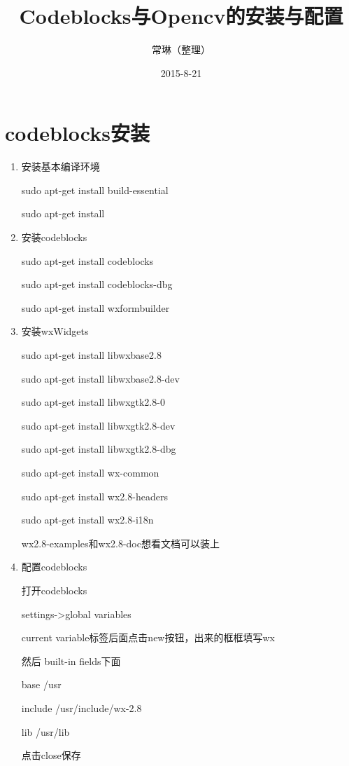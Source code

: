 \documentclass[a4paper,12pt]{article}
\title{Codeblocks与Opencv的安装与配置}
\author{常琳（整理）}
\date{2015-8-21}
\begin{document}
\maketitle

\section{codeblocks安装}

\begin{enumerate}

\item 安装基本编译环境

sudo apt-get install build-essential

sudo apt-get install

\item 安装codeblocks

sudo apt-get install codeblocks

sudo apt-get install codeblocks-dbg

sudo apt-get install wxformbuilder

\item 安装wxWidgets

sudo apt-get install libwxbase2.8

sudo apt-get install libwxbase2.8-dev

sudo apt-get install libwxgtk2.8-0

sudo apt-get install libwxgtk2.8-dev

sudo apt-get install libwxgtk2.8-dbg

sudo apt-get install wx-common

sudo apt-get install wx2.8-headers

sudo apt-get install wx2.8-i18n

wx2.8-examples和wx2.8-doc想看文档可以装上

\item 配置codeblocks

打开codeblocks

settings->global variables

current variable标签后面点击new按钮，出来的框框填写wx

然后 built-in fields下面

base /usr

include /usr/include/wx-2.8

lib /usr/lib

点击close保存 

\end{enumerate}
\end{document}
